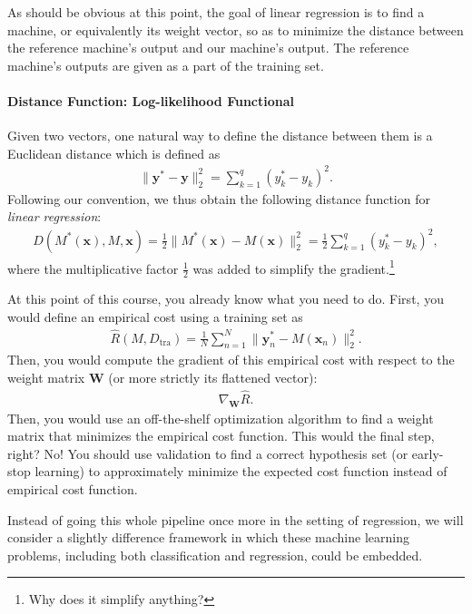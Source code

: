 \documentclass{report}
\newcommand{\vect}[1]{\mathbf{#1}}
\newcommand{\matr}[1]{\mathbf{#1}}
\newcommand{\vx}[0]{\vect{x}}
\newcommand{\vy}[0]{\vect{y}}
\newcommand{\mW}[0]{\matr{W}}
\newcommand{\tra}{\text{tra}}
\begin{document}
As should be obvious at this point, the goal of linear regression is to find a
machine, or equivalently its weight vector, so as to minimize the distance
between the reference machine's output and our machine's output. The reference
machine's outputs are given as a part of the training set.

\paragraph{Distance Function: Log-likelihood Functional}

Given two vectors, one natural way to define the distance between them is a
Euclidean distance which is defined as
\begin{align*}
    \|\vy^* - \vy\|_2^2 = \sum_{k=1}^q (y^*_k - y_k)^2.
\end{align*}
Following our convention, we thus obtain the following distance function for
{\it linear regression}:
\begin{align}
    \label{eq:linreg_dist}
    D(M^*(\vx), M, \vx) = \frac{1}{2} \|M^*(\vx) - M(\vx)\|_2^2 = 
    \frac{1}{2} \sum_{k=1}^q (y^*_k - y_k)^2,
\end{align}
where the multiplicative factor $\frac{1}{2}$ was added to simplify the
gradient.\footnote{
    Why does it simplify anything?
}

At this point of this course, you already know what you need to do. First, you
would define an empirical cost using a training set as
\begin{align*}
    \hat{R}(M, D_{\tra}) = \frac{1}{N} \sum_{n=1}^N
    \|\vy^*_n - M(\vx_n)\|^2_2.
\end{align*}
Then, you would compute the gradient of this empirical cost with respect to the
weight matrix $\mW$ (or more strictly its flattened vector):
\begin{align*}
    \nabla_{\mW} \hat{R}.
\end{align*}
Then, you would use an off-the-shelf optimization algorithm to find a weight
matrix that minimizes the empirical cost function. This would the final step,
right? No! You should use validation to find a correct hypothesis set (or
early-stop learning) to approximately minimize the expected cost function
instead of empirical cost function.

Instead of going this whole pipeline once more in the setting of regression, we
will consider a slightly difference framework in which these machine learning
problems, including both classification and regression, could be embedded. 
\end{document}
